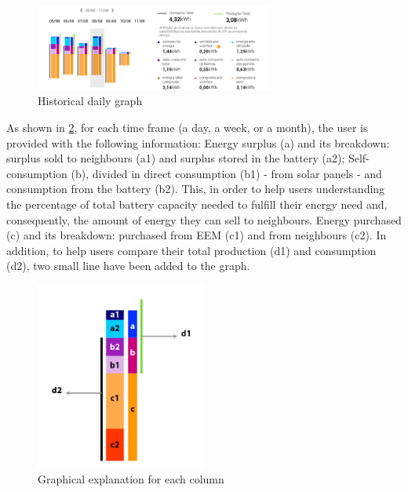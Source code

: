 \begin{figure}[h]
\centering
\includegraphics[width=0.7\textwidth]{./Images/ps6}
\caption{Historical daily graph}
\label{fig:ps6}
\end{figure}


As shown in \cref{fig:ps7}, for each time frame (a day, a week, or a month), the user is provided with the following information:
Energy surplus (a) and its breakdown: surplus sold to neighbours (a1) and surplus stored in the battery (a2);
Self-consumption (b), divided in direct consumption (b1) - from solar panels - and consumption from the battery (b2). This, in order to help users understanding the percentage of total battery capacity needed to fulfill their energy need and, consequently, the amount of energy they can sell to neighbours.
Energy purchased (c) and its breakdown: purchased from \ac{EEM} (c1) and from neighbours (c2).
In addition, to help users compare their total production (d1) and consumption (d2), two small line have been added to the graph.

\begin{figure}[h]
\centering
\includegraphics[width=0.5\textwidth]{./Images/ps7}
\caption{Graphical explanation for each column}
\label{fig:ps7}
\end{figure}


